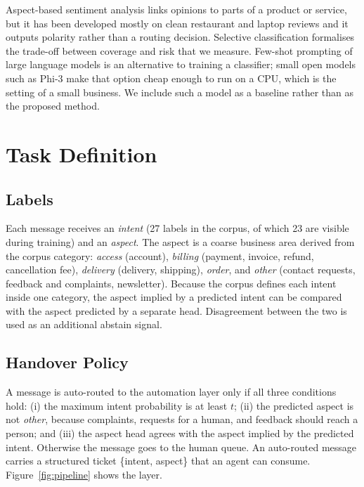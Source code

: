 \documentclass{icaiit2027}
\begin{document}
Aspect-based sentiment analysis \cite{pontiki2014} links opinions to parts of a product or service, but it has been developed mostly on clean restaurant and laptop reviews and it outputs polarity rather than a routing decision. Selective classification \cite{geifman2017} formalises the trade-off between coverage and risk that we measure. Few-shot prompting of large language models \cite{brown2020} is an alternative to training a classifier; small open models such as Phi-3 \cite{abdin2024} make that option cheap enough to run on a CPU, which is the setting of a small business. We include such a model as a baseline rather than as the proposed method.

\section{Task Definition}

\subsection{Labels}

Each message receives an \emph{intent} (27 labels in the corpus, of which 23 are visible during training) and an \emph{aspect}. The aspect is a coarse business area derived from the corpus category: \emph{access} (account), \emph{billing} (payment, invoice, refund, cancellation fee), \emph{delivery} (delivery, shipping), \emph{order}, and \emph{other} (contact requests, feedback and complaints, newsletter). Because the corpus defines each intent inside one category, the aspect implied by a predicted intent can be compared with the aspect predicted by a separate head. Disagreement between the two is used as an additional abstain signal.

\subsection{Handover Policy}

A message is auto-routed to the automation layer only if all three conditions hold: (i) the maximum intent probability is at least $t$; (ii) the predicted aspect is not \emph{other}, because complaints, requests for a human, and feedback should reach a person; and (iii) the aspect head agrees with the aspect implied by the predicted intent. Otherwise the message goes to the human queue. An auto-routed message carries a structured ticket \{intent, aspect\} that an agent can consume. Figure~\ref{fig:pipeline} shows the layer.
\end{document}
